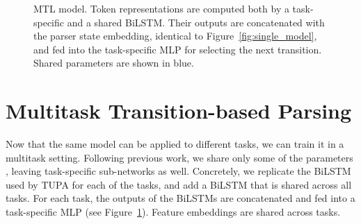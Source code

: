 \documentclass[11pt,a4paper]{article}
\begin{document}
\begin{figure}[t]
   \caption{MTL model.
      Token representations are computed both by a task-specific and a shared BiLSTM.
      Their outputs are concatenated with the parser state embedding,
      identical to Figure~\ref{fig:single_model},
      and fed into the task-specific MLP for selecting the next transition.
      Shared parameters are shown in blue.}\label{fig:multi_model}
\end{figure}


\section{Multitask Transition-based Parsing}\label{sec:multitask}

Now that the same model can be applied to different tasks, 
we can train it in a multitask setting.
Following previous work, we share only some of the parameters
\cite{N16-1179,P16-2038,C16-1013,C16-1059,C16-1179,E17-1005,P17-1186}, leaving task-specific
sub-networks as well.
Concretely, we replicate the BiLSTM used by TUPA for each of the tasks, and add
a BiLSTM that is shared across all tasks. 
For each task, the outputs of the BiLSTMs are concatenated and
fed into a task-specific MLP (see Figure~\ref{fig:multi_model}).
Feature embeddings are shared across tasks.
\end{document}
